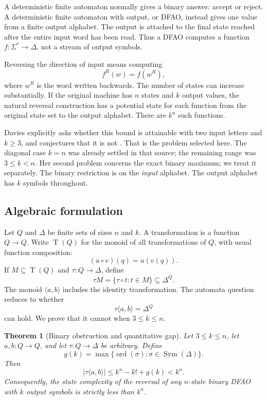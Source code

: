 \documentclass[11pt,a4paper]{article}
\numberwithin{equation}{section}
\newtheorem{theorem}{Theorem}[section]
\theoremstyle{definition}
\theoremstyle{remark}
\newcommand{\D}{\Delta}
\newcommand{\Sym}{\operatorname{Sym}}
\newcommand{\ord}{\operatorname{ord}}
\newcommand{\TQ}{\operatorname{T}(Q)}
\begin{document}
A deterministic finite automaton normally gives a binary answer: accept or
reject. A deterministic finite automaton with output, or DFAO, instead gives
one value from a finite output alphabet. The output is attached to the final
state reached after the entire input word has been read. Thus a DFAO computes
a function $f:\Sigma^*\to\D$, not a stream of output symbols.

Reversing the direction of input means computing
\[
 f^R(w)=f(w^R),
\]
where $w^R$ is the word written backwards. The number of states can increase
substantially. If the original machine has $n$ states and $k$ output values,
the natural reversal construction has a potential state for each function
from the original state set to the output alphabet. There are $k^n$ such
functions.

Davies explicitly asks whether this bound is attainable with two input
letters and $k\ge3$, and conjectures that it is not
\cite[Section~5, Problem~1, printed page~17]{Davies2017}. That is the
problem selected here. The diagonal case $k=n$ was already settled in that
source; the remaining range was $3\le k<n$. Her second problem concerns the
exact binary maximum; we treat it separately. The binary restriction is on the \emph{input}
alphabet. The output alphabet has $k$ symbols throughout.

\subsection{Algebraic formulation}

Let $Q$ and $\D$ be finite sets of sizes $n$ and $k$. A transformation is a
function $Q\to Q$. Write $\TQ$ for the monoid of all transformations of $Q$,
with usual function composition:
\[
 (u\circ v)(q)=u(v(q)).
\]
If $M\subseteq\TQ$ and $\tau:Q\to\D$, define
\[
 \tau M=\{\tau\circ t:t\in M\}\subseteq\D^Q.
\]
The monoid $\langle a,b\rangle$ includes the identity transformation.
The automata question reduces to whether
\begin{equation}\label{eq:fullorbit}
 \tau\langle a,b\rangle=\D^Q
\end{equation}
can hold. We prove that it cannot when $3\le k\le n$.

\begin{theorem}[Binary obstruction and quantitative gap]\label{thm:main}
Let $3\le k\le n$, let $a,b:Q\to Q$, and let $\tau:Q\to\D$ be arbitrary.
Define
\[
 g(k)=\max\{\ord(\sigma):\sigma\in\Sym(\D)\}.
\]
Then
\begin{equation}\label{eq:main}
 |\tau\langle a,b\rangle|\le k^n-k!+g(k)<k^n.
\end{equation}
Consequently, the state complexity of the reversal of any $n$-state binary
DFAO with $k$ output symbols is strictly less than $k^n$.
\end{theorem}
\end{document}
